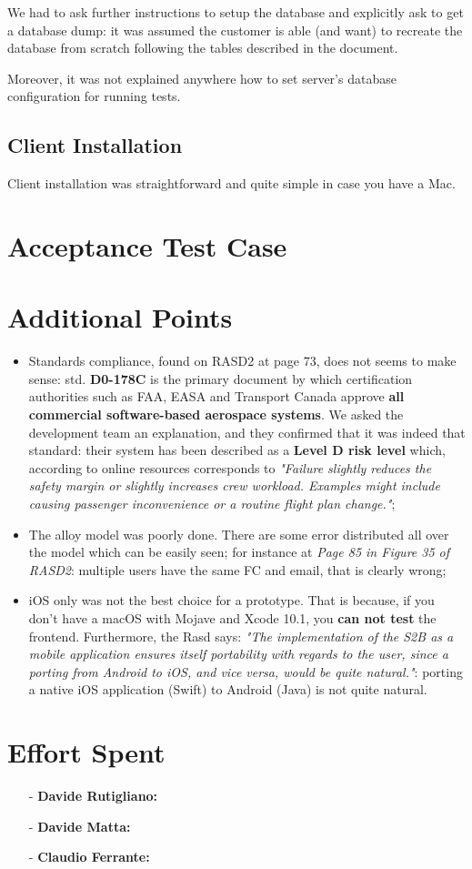 \documentclass[a4paper]{article}
\begin{document}
We had to ask further instructions to setup the database and explicitly ask to get a database dump: it was assumed the customer is able (and want) to recreate the database from scratch following the tables described in the document.

Moreover, it was not explained anywhere how to set server's database configuration for running tests.
\subsection{Client Installation}
Client installation was straightforward and quite simple in case you have a Mac.

\newpage
\section{Acceptance Test Case}

\newpage
\section{Additional Points}
\begin{itemize}
    \item Standards compliance, found on RASD2 at page 73, does not seems to make sense: std. \textbf{D0-178C} is the primary document by which certification authorities such as FAA, EASA and Transport Canada approve \textbf{all commercial software-based aerospace systems}. We asked the development team an explanation, and they confirmed that it was indeed that standard: their system has been described as a \textbf{Level D risk level} which, according to online resources corresponds to \textit{"Failure slightly reduces the safety margin or slightly increases crew workload. Examples might include causing passenger inconvenience or a routine flight plan change."};
    
    \item The alloy model was poorly done. There are some error distributed all over the model which can be easily seen; for instance at \textit{Page 85 in Figure 35 of RASD2}: multiple users have the same FC and email, that is clearly wrong;
    
    \item iOS only was not the best choice for a prototype. That is because, if you don't have a macOS with Mojave and Xcode 10.1, you \textbf{can not test} the frontend. Furthermore, the Rasd says: \textit{"The implementation of the S2B as a mobile application ensures itself portability with regards to the user, since a porting from Android to iOS, and vice versa, would be quite natural."}: porting a native iOS application (Swift) to Android (Java) is not quite natural.
\end{itemize}

\newpage
\section{Effort Spent}
    \begin{itemize}
        \item[-] \textbf{Davide Rutigliano:}
        
        \item[-] \textbf{Davide Matta:}
        
        \item[-] \textbf{Claudio Ferrante:}
    \end{itemize}
\end{document}
